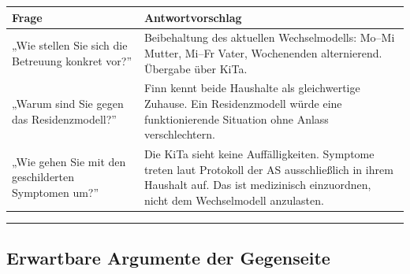 \documentclass[
  11pt,
  a4paper,
]{article}
\newcounter{none}
\begin{document}
{\def\LTcaptype{none} %
\begin{longtable}[]{@{}
  >{\raggedright\arraybackslash}p{}
  >{\raggedright\arraybackslash}p{}@{}}
\toprule\noalign{}
\begin{minipage}[b]{\linewidth}\raggedright
Frage
\end{minipage} & \begin{minipage}[b]{\linewidth}\raggedright
Antwortvorschlag
\end{minipage} \\
\midrule\noalign{}
\endhead
\bottomrule\noalign{}
\endlastfoot
„Wie stellen Sie sich die Betreuung konkret vor?'' & Beibehaltung des
aktuellen Wechselmodells: Mo--Mi Mutter, Mi--Fr Vater, Wochenenden
alternierend. Übergabe über KiTa. \\
„Warum sind Sie gegen das Residenzmodell?'' & Finn kennt beide Haushalte
als gleichwertige Zuhause. Ein Residenzmodell würde eine funktionierende
Situation ohne Anlass verschlechtern. \\
„Wie gehen Sie mit den geschilderten Symptomen um?'' & Die KiTa sieht
keine Auffälligkeiten. Symptome treten laut Protokoll der AS
ausschließlich in ihrem Haushalt auf. Das ist medizinisch einzuordnen,
nicht dem Wechselmodell anzulasten. \\
\end{longtable}
}

\begin{center}\rule{0.5\linewidth}{0.5pt}\end{center}

\subsection{Erwartbare Argumente der
Gegenseite}\label{erwartbare-argumente-der-gegenseite}
\end{document}
